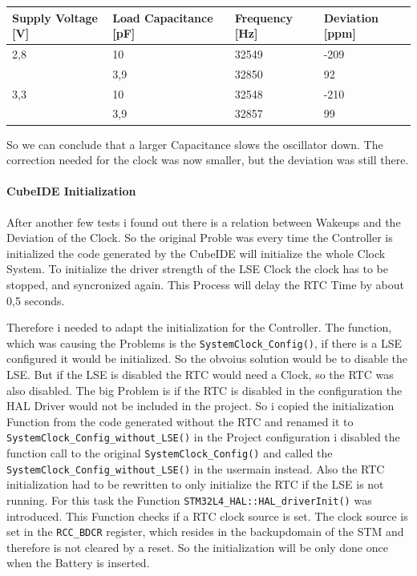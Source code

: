 \begin{tabular}{|l|l|l|l|}
\hline
Supply Voltage {[}V{]} & Load Capacitance {[}pF{]} & Frequency {[}Hz{]} & Deviation {[}ppm{]} \\ \hline
2,8   & 10                        & 32549              & -209                \\ \cline{2-4} 
                       & 3,9                       & 32850              & 92                  \\ \hline
3,3   & 10                        & 32548              & -210                \\ \cline{2-4} 
                       & 3,9                       & 32857              & 99                  \\ \hline
\end{tabular}
\vspace{1cm}

So we can conclude that a larger Capacitance slows the oscillator down. The correction needed for the clock was now smaller, but the deviation was still there.

\paragraph{CubeIDE Initialization}
After another few tests i found out there is a relation between Wakeups and the Deviation of the Clock. So the original Proble was every time the Controller is initialized the code generated by the CubeIDE will initialize the whole Clock System. To initialize the driver strength of the LSE Clock the clock has to be stopped, and syncronized again. This Process will delay the RTC Time by about 0,5 seconds.

Therefore i needed to adapt the initialization for the Controller. The function, which was causing the Problems is the \verb!SystemClock_Config()!, if there is a LSE configured it would be initialized. So the obvoius solution would be to disable the LSE. But if the LSE is disabled the RTC would need a Clock, so the RTC was also disabled. The big Problem is if the RTC is disabled in the configuration the HAL Driver would not be included in the project. So i copied the initialization Function from the code generated without the RTC and renamed it to \verb!SystemClock_Config_without_LSE()! in the Project configuration i disabled the function call to the original \verb!SystemClock_Config()! and called the \verb!SystemClock_Config_without_LSE()! in the usermain instead. Also the RTC initialization had to be rewritten to only initialize the RTC if the LSE is not running. For this task the Function \verb!STM32L4_HAL::HAL_driverInit()! was introduced. This Function checks if a RTC clock source is set. The clock source is set in the \verb!RCC_BDCR! register, which resides in the backupdomain of the STM and therefore is not cleared by a reset. So the initialization will be only done once when the Battery is inserted.
